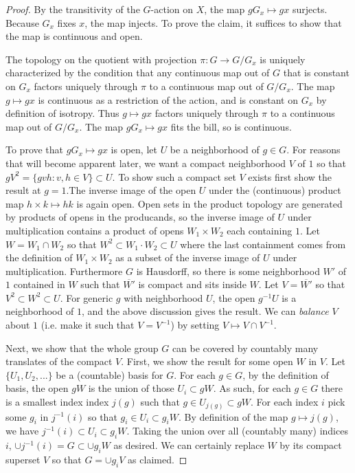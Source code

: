 \documentclass[11pt]{amsart}
\begin{document}
\begin{proof}
	By the transitivity of the $G$-action on $X$, the map $gG_x\mapsto gx$ surjects. Because $G_x$ fixes $x$, the map injects. To prove the claim, it suffices to show that the map is continuous and open.

The topology on the quotient with projection $\pi:G\to G/G_x$ is uniquely characterized by the condition that any continuous map out of $G$ that is constant on $G_x$ factors uniquely through $\pi$ to a continuous map out of $G/G_x$. The map $g \mapsto gx$ is continuous as a restriction of the action, and is constant on $G_x$ by definition of isotropy. Thus $g \mapsto gx$ factors uniquely through $\pi$ to a continuous map out of $G/G_x$. The map $gG_x \mapsto gx$ fits the bill, so is continuous.

To prove that $gG_x\mapsto gx$ is open, let $U$ be a neighborhood of $g \in G$. For reasons that will become apparent later, we want a compact neighborhood $V$ of $1$ so that $gV^2=\{gvh:v,h\in V\}\subset U$. To show such a compact set $V$ exists first show the result at $g=1$.The inverse image of the open $U$ under the (continuous) product map $h\times k\mapsto hk$ is again open. Open sets in the product topology are generated by products of opens in the producands, so the inverse image of $U$ under multiplication contains a product of opens $W_1\times W_2$ each containing $1$. Let $W=W_1\cap W_2$ so that $W^2\subset W_1 \cdot W_2 \subset U$ where the last containment comes from the definition of $W_1\times W_2$ as a subset of the inverse image of $U$ under multiplication. Furthermore $G$ is Hausdorff, so there is some neighborhood $W'$ of $1$ contained in $W$ such that $\overline{W'}$ is compact and sits inside $W$. Let $V=\overline{W'}$ so that $V^2\subset W^2\subset U$. For generic $g$ with neighborhood $U$, the open $g^{-1}U$ is a neighborhood of $1$, and the above discussion gives the result. We can \emph{balance} $V$ about $1$ (i.e. make it such that $V=V^{-1}$) by setting $V\mapsto V \cap V^{-1}$.

Next, we show that the whole group $G$ can be covered by countably many translates of the compact $V$. First, we show the result for some open $W$ in $V$. Let $\{U_1,U_2,...\}$ be a (countable) basis for $G$. For each $g\in G$, by the definition of basis, the open $gW$ is the union of those $U_i\subset gW$. As such, for each $g\in G$ there is a smallest index index $j(g)$ such that $g \in U_{j(g)} \subset gW$. For each index $i$ pick some $g_i$ in $j^{-1}(i)$ so that $g_i \in U_i \subset g_i W$. By definition of the map $g\mapsto j(g)$, we have $j^{-1}(i)\subset U_i \subset g_i W$. Taking the union over all (countably many) indices $i$, $\cup j^{-1}(i)=G \subset \cup g_i W$ as desired. We can certainly replace $W$ by its compact superset $V$ so that $G=\cup g_i V$ as claimed.


\end{proof}
\end{document}
